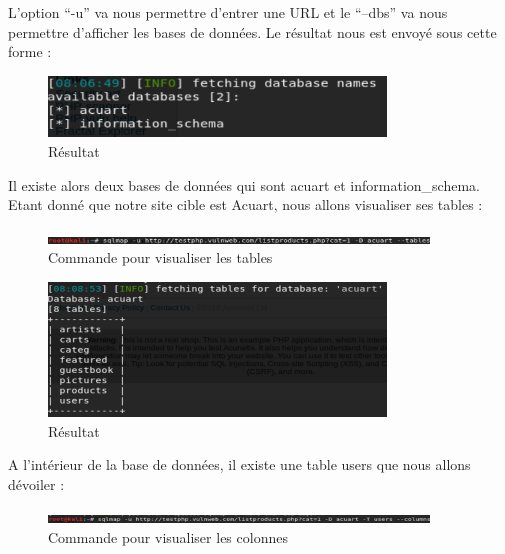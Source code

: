 L’option “-u” va nous permettre d’entrer une URL et le “--dbs” va nous permettre d’afficher les bases de données. Le résultat nous est envoyé sous cette forme :

\begin{figure}[htp!]
  \centering
  \setlength\figureheight{7cm}
  \setlength\figurewidth{9cm}
  \includegraphics[width=0.8\textwidth]{oui/Ancien/imangeancien/SQLi/3.PNG}
  \caption{Résultat}
  \label{fig:courbe-tikz}
\end{figure}

Il existe alors deux bases de données qui sont acuart et information\_schema. Etant donné que notre site cible est Acuart, nous allons visualiser ses tables :

\begin{figure}[htp!]
  \centering
  \setlength\figureheight{7cm}
  \setlength\figurewidth{9cm}
  \includegraphics[width=0.9\textwidth]{oui/Ancien/imangeancien/SQLi/4.PNG}
  \caption{Commande pour visualiser les tables}
  \label{fig:courbe-tikz}
\end{figure}

\begin{figure}[htp!]
  \centering
  \setlength\figureheight{7cm}
  \setlength\figurewidth{9cm}
  \includegraphics[width=0.8\textwidth]{oui/Ancien/imangeancien/SQLi/5.PNG}
  \caption{Résultat}
  \label{fig:courbe-tikz}
\end{figure}

A l’intérieur de la base de données, il existe une table users que nous allons dévoiler :

\begin{figure}[htp!]
  \centering
  \setlength\figureheight{7cm}
  \setlength\figurewidth{9cm}
  \includegraphics[width=0.9\textwidth]{oui/Ancien/imangeancien/SQLi/6.PNG}
  \caption{Commande pour visualiser les colonnes}
  \label{fig:courbe-tikz}
\end{figure}

